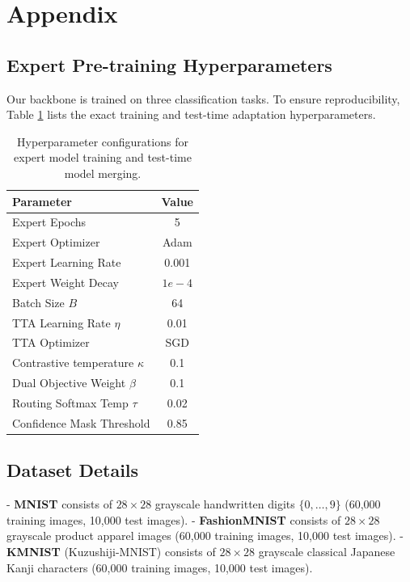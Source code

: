 \documentclass{article}
\theoremstyle{plain}
\theoremstyle{definition}
\theoremstyle{remark}
\begin{document}
\clearpage



\newpage
\appendix
\onecolumn
\section{Appendix}

\subsection{Expert Pre-training Hyperparameters}
Our backbone is trained on three classification tasks. To ensure reproducibility, Table \ref{tab:hyper} lists the exact training and test-time adaptation hyperparameters.

\begin{table}[h]
\caption{Hyperparameter configurations for expert model training and test-time model merging.}
\label{tab:hyper}
\begin{center}
\begin{small}
\begin{tabular}{lc}
\toprule
Parameter & Value \\
\midrule
Expert Epochs & 5 \\
Expert Optimizer & Adam \\
Expert Learning Rate & 0.001 \\
Expert Weight Decay & $1e-4$ \\
Batch Size $B$ & 64 \\
TTA Learning Rate $\eta$ & 0.01 \\
TTA Optimizer & SGD \\
Contrastive temperature $\kappa$ & 0.1 \\
Dual Objective Weight $\beta$ & 0.1 \\
Routing Softmax Temp $\tau$ & 0.02 \\
Confidence Mask Threshold & 0.85 \\
\bottomrule
\end{tabular}
\end{small}
\end{center}
\end{table}

\subsection{Dataset Details}
- \textbf{MNIST} consists of $28 \times 28$ grayscale handwritten digits $\{0, \dots, 9\}$ (60,000 training images, 10,000 test images).
- \textbf{FashionMNIST} consists of $28 \times 28$ grayscale product apparel images (60,000 training images, 10,000 test images).
- \textbf{KMNIST} (Kuzushiji-MNIST) consists of $28 \times 28$ grayscale classical Japanese Kanji characters (60,000 training images, 10,000 test images).
\end{document}
